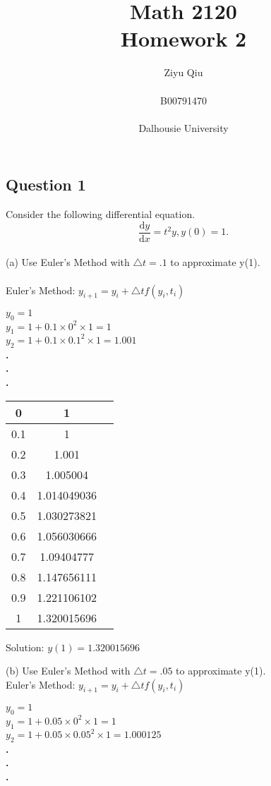 \documentclass[12pt]{article}
\title{Math 2120 \\ Homework 2}
\author{Ziyu Qiu \\  \\ B00791470 \\ \\ Dalhousie University}
\begin{document}
\maketitle

\vspace{0.5in}
\pagebreak


\subsection*{Question 1}
Consider the following differential equation.\\
\[
\frac{\text{d}y}{\text{d}x}=t^{2}y,  y(0)=1.
\] \\
(a) Use Euler's Method with $\triangle t=.1 $  to approximate y(1).\\ 
\\
Euler's Method: 
$y_{i+1}=y_{i}+\triangle t f(y_{i},t_{i})$

\begin{flushleft}
	$y_{0}=1$\\
	$y_{1}=1+0.1\times0^2\times1=1$\\
	$y_{2}=1+0.1\times0.1^2\times1=1.001$\\
\textbf{.\\
	.\\
	.\\}

\begin{center}
	\begin{tabular}{ |c|c|c| } 
		\hline
		0 & 1 \\ \hline
		0.1 & 1 \\ \hline
		0.2 & 1.001 \\ \hline
		0.3 & 1.005004 \\ \hline
		0.4 & 1.014049036 \\ \hline
		0.5 & 1.030273821 \\ \hline
		0.6 & 1.056030666 \\ \hline
		0.7 & 1.09404777 \\ \hline
		0.8 & 1.147656111 \\ \hline
		0.9 & 1.221106102 \\ \hline
		1 & 1.320015696 \\ \hline
	\end{tabular}
\end{center}
\end{flushleft}

Solution: $y(1)=1.320015696$

\pagebreak
(b) Use Euler's Method with $\triangle t=.05 $  to approximate y(1).\\
Euler's Method: 
$
y_{i+1}=y_{i}+\triangle t f(y_{i},t_{i})
$
\begin{flushleft}
	$y_{0}=1$\\
	$y_{1}=1+0.05\times0^2\times1=1$\\
	$y_{2}=1+0.05\times0.05^2\times1=1.000125$\\
	\textbf{.\\
		.\\
		.\\}
\end{flushleft}
\end{document}
